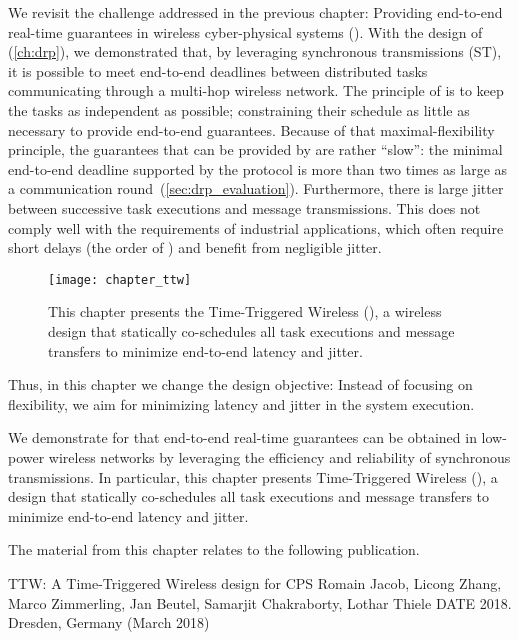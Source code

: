 

We revisit the challenge addressed in the previous chapter: Providing end-to-end real-time guarantees in wireless cyber-physical systems (\CPS).
With the design of \DRP (\cref{ch:drp}), we demonstrated that, by leveraging synchronous transmissions (ST), it is possible to meet end-to-end deadlines between distributed tasks communicating through a multi-hop wireless network.
The principle of \DRP is to keep the tasks as independent as possible; \ie constraining their schedule as little as necessary to provide end-to-end guarantees.
Because of that maximal-flexibility principle, the guarantees that can be provided by \DRP are rather ``slow'': the minimal end-to-end deadline supported by the protocol is more than two times as large as a communication round~(\cref{sec:drp_evaluation}).
Furthermore, there is large jitter between successive task executions and message transmissions.
This does not comply well with the requirements of industrial \CPS applications, which often require short delays (the order of \ms) and benefit from negligible jitter.

\begin{figure}
  \centering
  \texttt{[image: chapter\_ttw]}
  \caption{This chapter presents the Time-Triggered Wireless (\TTW), a wireless \CPS design that statically co-schedules all task executions and message transfers to minimize end-to-end latency and jitter.}
  \label{fig:chapter_ttw}
\end{figure}

Thus, in this chapter we change the design objective: Instead of focusing on flexibility, we aim for minimizing latency and jitter in the system execution.

We demonstrate for that end-to-end real-time guarantees can be obtained in low-power wireless networks by leveraging the efficiency and reliability of synchronous transmissions.
In particular, this chapter presents Time-Triggered Wireless (\TTW), a design that statically co-schedules all task executions and message transfers to minimize end-to-end latency and jitter.

\pagebreak
\begin{publi}

  The material from this chapter relates to the following publication.

  \inlineRef%
  {TTW: A Time-Triggered Wireless design for CPS}%
  {Romain Jacob, Licong Zhang, Marco Zimmerling, Jan Beutel, Samarjit Chakraborty, Lothar Thiele}%
  {DATE 2018. Dresden, Germany (March 2018)}

\end{publi}
